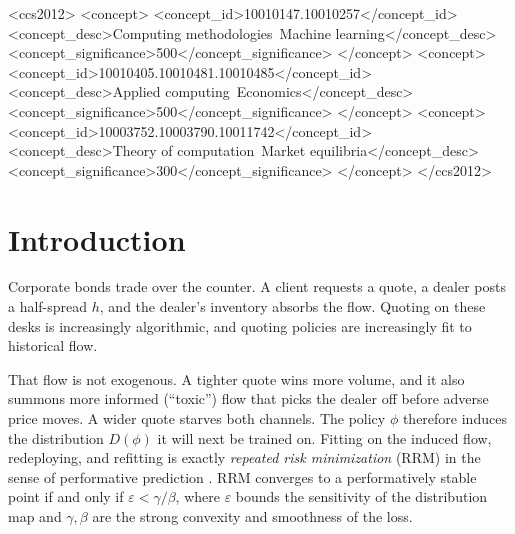 \documentclass[sigconf]{acmart}
\newcommand{\eps}{\varepsilon}
\begin{document}
\begin{CCSXML}
<ccs2012>
<concept>
<concept_id>10010147.10010257</concept_id>
<concept_desc>Computing methodologies~Machine learning</concept_desc>
<concept_significance>500</concept_significance>
</concept>
<concept>
<concept_id>10010405.10010481.10010485</concept_id>
<concept_desc>Applied computing~Economics</concept_desc>
<concept_significance>500</concept_significance>
</concept>
<concept>
<concept_id>10003752.10003790.10011742</concept_id>
<concept_desc>Theory of computation~Market equilibria</concept_desc>
<concept_significance>300</concept_significance>
</concept>
</ccs2012>
\end{CCSXML}


\maketitle

\section{Introduction}

Corporate bonds trade over the counter. A client requests a quote, a dealer
posts a half-spread $h$, and the dealer's inventory absorbs the flow.
Quoting on these desks is increasingly algorithmic, and quoting policies are
increasingly fit to historical flow.

That flow is not exogenous. A tighter quote wins more volume, and it also
summons more informed (``toxic'') flow that picks the dealer off before
adverse price moves. A wider quote starves both channels. The policy $\phi$
therefore induces the distribution $D(\phi)$ it will next be trained on.
Fitting on the induced flow, redeploying, and refitting is exactly
\emph{repeated risk minimization} (RRM) in the sense of performative
prediction \cite{perdomo2020performative}. RRM converges to a
performatively stable point if and only if $\eps<\gamma/\beta$, where $\eps$
bounds the sensitivity of the distribution map and $\gamma,\beta$ are the
strong convexity and smoothness of the loss.
\end{document}
